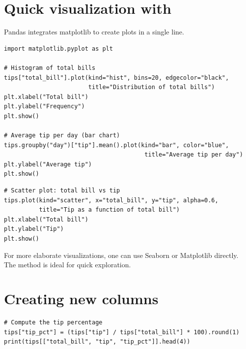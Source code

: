 \section{Quick visualization with }

Pandas integrates matplotlib to create plots in a single line.

\begin{codeblock}[title=\textbf{Python}]
\begin{verbatim}
import matplotlib.pyplot as plt

# Histogram of total bills
tips["total_bill"].plot(kind="hist", bins=20, edgecolor="black",
                        title="Distribution of total bills")
plt.xlabel("Total bill")
plt.ylabel("Frequency")
plt.show()

# Average tip per day (bar chart)
tips.groupby("day")["tip"].mean().plot(kind="bar", color="blue",
                                        title="Average tip per day")
plt.ylabel("Average tip")
plt.show()
\end{verbatim}
\end{codeblock}

\begin{codeblock}[title=\textbf{Python}]
\begin{verbatim}
# Scatter plot: total bill vs tip
tips.plot(kind="scatter", x="total_bill", y="tip", alpha=0.6,
          title="Tip as a function of total bill")
plt.xlabel("Total bill")
plt.ylabel("Tip")
plt.show()
\end{verbatim}
\end{codeblock}

\begin{remark}
For more elaborate visualizations, one can use Seaborn or Matplotlib
directly. The  method is ideal for quick exploration.
\end{remark}

\section{Creating new columns}

\begin{codeblock}[title=\textbf{Python}]
\begin{verbatim}
# Compute the tip percentage
tips["tip_pct"] = (tips["tip"] / tips["total_bill"] * 100).round(1)
print(tips[["total_bill", "tip", "tip_pct"]].head(4))
\end{verbatim}
\end{codeblock}

